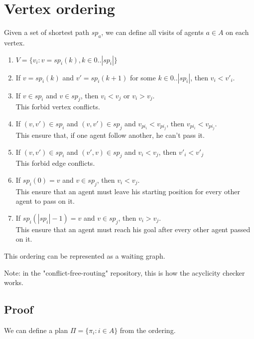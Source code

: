 \section{Vertex ordering}\label{sec:vo}

Given a set of shortest path $sp_a$, we can define all visits of agents $a\in A$ on each vertex.

\begin{enumerate}
  \item $V = \{v_i : v = sp_i(k), k \in 0..|sp_i|\}$
  \item If $v = sp_i(k)$ and $v' = sp_i(k+1)$ for some $k \in 0..|sp_i|$, then $v_{i}<v'_{i}$.\label{succ}
  \item If $v \in sp_i$ and $v \in sp_j$, then $v_{i}<v_{j}$ or $v_{i}>v_{j}$.
  \\ This forbid vertex conflicts.\label{vercon}
  \item If $(v,v') \in sp_i$ and $(v,v') \in sp_j$ and $v_{pi_i} < v_{pi_j}$, then $v_{pi_i} < v_{pi_j}$. \\ This ensure that, if one agent follow another, he can't pass it.
  \item If $(v,v') \in sp_i$ and $(v',v) \in sp_j$ and $v_{i} < v_{j}$, then $v'_{i} < v'_{j}$ \\ This forbid edge conflicts.\label{edgcon}
  \item If $sp_i(0)=v$ and $v \in sp_j$, then $v_{i} < v_{j}$. \\ This ensure that an agent must leave his starting position for every other agent to pass on it.
  \item If $sp_i(|sp_i|-1)=v$ and $v \in sp_j$, then $v_{i} > v_{j}$. \\ This ensure that an agent must reach his goal after every other agent passed on it.
\end{enumerate}

This ordering can be represented as a waiting graph.

Note: in the "conflict-free-routing" repository, this is how the acyclicity checker works.

\subsection{Proof}

We can define a plan $\Pi = \{\pi_i : i\in A\}$ from the ordering.

